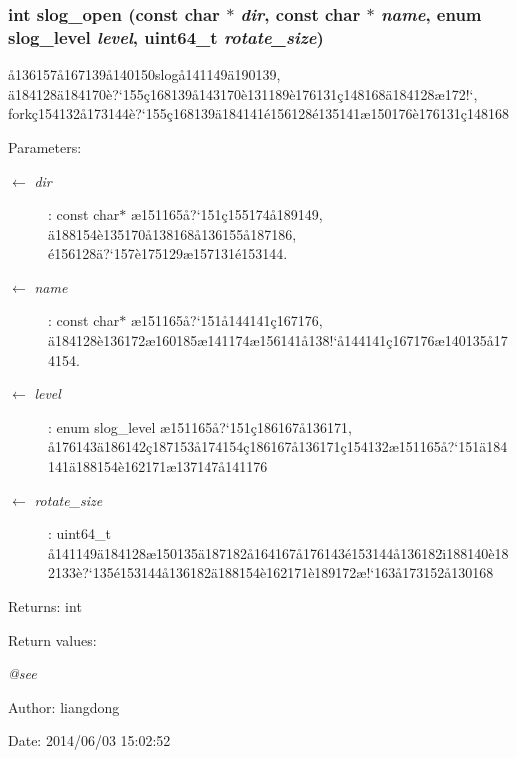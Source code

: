 \subsubsection{\setlength{\rightskip}{0pt plus 5cm}int slog\_\-open (const char $\ast$ {\em dir}, const char $\ast$ {\em name}, enum slog\_\-level {\em level}, uint64\_\-t {\em rotate\_\-size})}\label{slog_8c_a6}


\aa{}136157\aa{}167139\aa{}140150slog\aa{}141149\"{a}190139, \"{a}184128\"{a}184170\`{e}?`155\c{c}168139\aa{}143170\`{e}131189\`{e}176131\c{c}148168\"{a}184128\ae{}172!`, fork\c{c}154132\aa{}173144\`{e}?`155\c{c}168139\"{a}184141\'{e}156128\'{e}135141\ae{}150176\`{e}176131\c{c}148168 

\begin{Desc}
\item[Parameters:]
\begin{description}
\item[\mbox{$\leftarrow$} {\em dir}]: const char$\ast$ \ae{}151165\aa{}?`151\c{c}155174\aa{}189149, \"{a}188154\`{e}135170\aa{}138168\aa{}136155\aa{}187186, \'{e}156128\"{a}?`157\`{e}175129\ae{}157131\'{e}153144. \item[\mbox{$\leftarrow$} {\em name}]: const char$\ast$ \ae{}151165\aa{}?`151\aa{}144141\c{c}167176, \"{a}184128\`{e}136172\ae{}160185\ae{}141174\ae{}156141\aa{}138!`\aa{}144141\c{c}167176\ae{}140135\aa{}174154. \item[\mbox{$\leftarrow$} {\em level}]: enum slog\_\-level \ae{}151165\aa{}?`151\c{c}186167\aa{}136171, \aa{}176143\"{a}186142\c{c}187153\aa{}174154\c{c}186167\aa{}136171\c{c}154132\ae{}151165\aa{}?`151\"{a}184141\"{a}188154\`{e}162171\ae{}137147\aa{}141176 \item[\mbox{$\leftarrow$} {\em rotate\_\-size}]: uint64\_\-t \aa{}141149\"{a}184128\ae{}150135\"{a}187182\aa{}164167\aa{}176143\'{e}153144\aa{}136182\"{\i}188140\`{e}182133\`{e}?`135\'{e}153144\aa{}136182\"{a}188154\`{e}162171\`{e}189172\ae{}!`163\aa{}173152\aa{}130168 \end{description}
\end{Desc}
\begin{Desc}
\item[Returns:]int \end{Desc}
\begin{Desc}
\item[Return values:]
\begin{description}
\item[{\em @see}]\end{description}
\end{Desc}
\begin{Desc}
\item[Author:]liangdong \end{Desc}
\begin{Desc}
\item[Date:]2014/06/03 15:02:52 \end{Desc}
